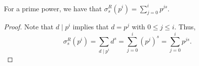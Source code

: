 \begin{theorem}
\label{sigmaR_apply_prime_pow}
\leanok
For a prime power, we have that $\sigma^R_s(p^i)=\sum_{j=0}^ip^{js}$.
\end{theorem}
\begin{proof}
\leanok
Note that $d\mid p^i$ implies that $d=p^j$ with $0\leq j\leq i$. Thus,
    $$\sigma^R_s(p^i)=\sum_{d\mid p^i}d^s=\sum_{j=0}^i(p^j)^s=\sum_{j=0}^ip^{js}.$$
\end{proof}
